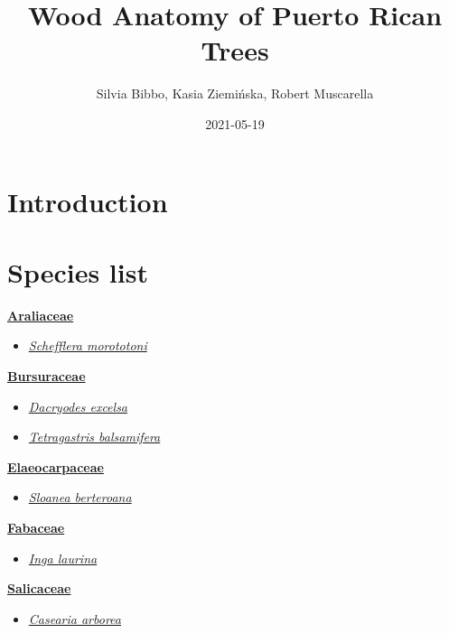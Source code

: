 \documentclass[
]{book}
\title{Wood Anatomy of Puerto Rican Trees}
\author{Silvia Bibbo, Kasia Ziemińska, Robert Muscarella}
\date{2021-05-19}
\providecommand{\tightlist}{%
  \setlength{\itemsep}{0pt}\setlength{\parskip}{0pt}}
\begin{document}
\maketitle

{
\setcounter{tocdepth}{1}
\tableofcontents
}
\hypertarget{introduction}{%
\chapter*{Introduction}\label{introduction}}

\hypertarget{species-list}{%
\chapter*{Species list}\label{species-list}}

\textbf{\protect\hyperlink{araliaceae}{Araliaceae}}

\begin{itemize}
\tightlist
\item
  \protect\hyperlink{schefflera-morototoni}{\emph{Schefflera morototoni}}
\end{itemize}

\textbf{\protect\hyperlink{bursuraceae}{Bursuraceae}}

\begin{itemize}
\tightlist
\item
  \protect\hyperlink{dacryodes-excelsa}{\emph{Dacryodes excelsa}}
\item
  \protect\hyperlink{tetragastris-balsamifera}{\emph{Tetragastris balsamifera}}
\end{itemize}

\textbf{\protect\hyperlink{elaeocarpaceae}{Elaeocarpaceae}}

\begin{itemize}
\tightlist
\item
  \protect\hyperlink{sloanea-berteroana}{\emph{Sloanea berteroana}}
\end{itemize}

\textbf{\protect\hyperlink{fabaceae}{Fabaceae}}

\begin{itemize}
\tightlist
\item
  \protect\hyperlink{inga-laurina}{\emph{Inga laurina}}
\end{itemize}

\textbf{\protect\hyperlink{salicaceae}{Salicaceae}}

\begin{itemize}
\tightlist
\item
  \protect\hyperlink{casearia-arborea}{\emph{Casearia arborea}}
\end{itemize}
\end{document}
